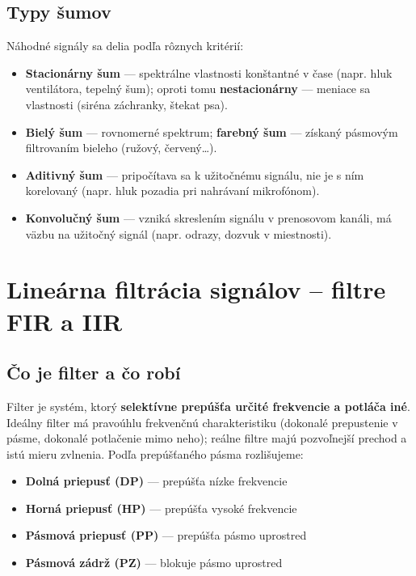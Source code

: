 \section{Typy šumov}

Náhodné signály sa delia podľa rôznych kritérií:
\begin{itemize}
  \item \textbf{Stacionárny šum} --- spektrálne vlastnosti konštantné v čase
        (napr. hluk ventilátora, tepelný šum); oproti tomu \textbf{nestacionárny}
        --- meniace sa vlastnosti (siréna záchranky, štekat psa).
  \item \textbf{Bielý šum} --- rovnomerné spektrum;
        \textbf{farebný šum} --- získaný pásmovým filtrovaním bieleho
        (ružový, červený\ldots).
  \item \textbf{Aditivný šum} --- pripočítava sa k užitočnému signálu, nie je
        s ním korelovaný (napr. hluk pozadia pri nahrávaní mikrofónom).
  \item \textbf{Konvolučný šum} --- vzniká skreslením signálu v prenosovom
        kanáli, má väzbu na užitočný signál (napr. odrazy, dozvuk v miestnosti).
\end{itemize}

% 
\chapter{Lineárna filtrácia signálov -- filtre FIR a IIR}

\section{Čo je filter a čo robí}

Filter je systém, ktorý \textbf{selektívne prepúšťa určité frekvencie
a potláča iné}. Ideálny filter má pravoúhlu frekvenčnú charakteristiku
(dokonalé prepustenie v pásme, dokonalé potlačenie mimo neho); reálne filtre
majú pozvoľnejší prechod a istú mieru zvlnenia. Podľa prepúšťaného pásma
rozlišujeme:
\begin{itemize}
  \item \textbf{Dolná priepusť (DP)} --- prepúšťa nízke frekvencie
  \item \textbf{Horná priepusť (HP)} --- prepúšťa vysoké frekvencie
  \item \textbf{Pásmová priepusť (PP)} --- prepúšťa pásmo uprostred
  \item \textbf{Pásmová zádrž (PZ)} --- blokuje pásmo uprostred
\end{itemize}

